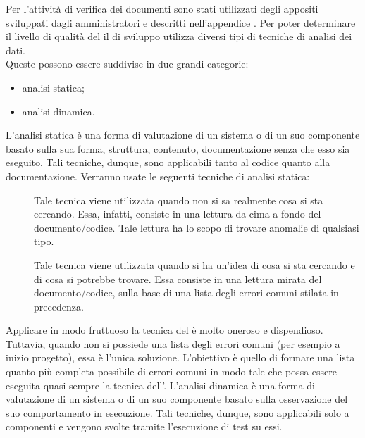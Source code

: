 	
	Per l'attività di verifica dei documenti sono stati utilizzati degli appositi  sviluppati dagli amministratori e descritti nell'appendice .
			Per poter determinare il livello di qualità del  il  di sviluppo utilizza diversi tipi di tecniche di analisi dei dati.\\
			Queste possono essere suddivise in due grandi categorie:
			\begin{itemize}
				\item analisi statica;
				\item analisi dinamica.
			\end{itemize}
				L'analisi statica è una forma di valutazione di un sistema o di un suo componente basato sulla sua forma, struttura, contenuto, documentazione senza che esso sia eseguito. Tali tecniche, dunque, sono applicabili tanto al codice quanto alla documentazione.
				Verranno usate le seguenti tecniche di analisi statica:
				\begin{description}
					\item[] Tale tecnica viene utilizzata quando non si sa realmente cosa si sta cercando. Essa, infatti, consiste in una lettura da cima a fondo del documento/codice. Tale lettura ha lo scopo di trovare anomalie di qualsiasi tipo.
					\item[] Tale tecnica viene utilizzata quando si ha un'idea di cosa si sta cercando e di cosa si potrebbe trovare. Essa consiste in una lettura mirata del documento/codice, sulla base di una lista degli errori comuni stilata in precedenza.
				\end{description}
				Applicare in modo fruttuoso la tecnica del  è molto oneroso e dispendioso. Tuttavia, quando non si possiede una lista degli	errori comuni (per esempio a inizio progetto), essa è l'unica soluzione. L'obiettivo è quello di formare una lista quanto più completa possibile di errori comuni in modo tale che possa essere eseguita quasi sempre la tecnica dell'.
				L'analisi dinamica è una forma di valutazione di un sistema  o di un suo componente basato sulla osservazione del suo comportamento in esecuzione. Tali tecniche, dunque, sono applicabili solo a componenti  e vengono svolte tramite l'esecuzione di test su essi.\\
